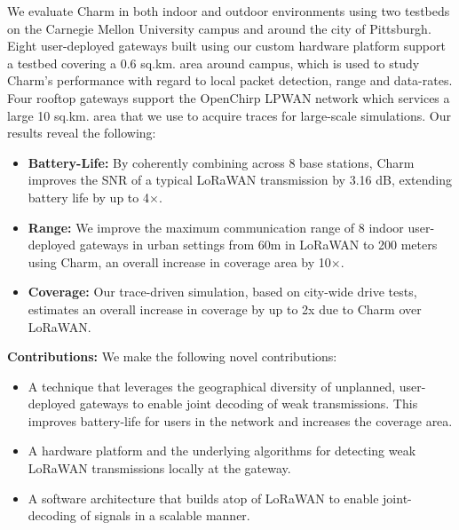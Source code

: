 We evaluate Charm in both indoor and outdoor environments using two testbeds
on the Carnegie Mellon University campus and around the city of Pittsburgh.
Eight user-deployed gateways built using our custom hardware platform support
a testbed covering a 0.6 sq.km. area around campus, which is used to study
Charm's performance with regard to local packet detection, range and
data-rates. Four rooftop gateways support the OpenChirp LPWAN network which
services a large 10 sq.km. area that we use to acquire traces for large-scale
simulations. Our results reveal the following:

\begin{itemize}
    \item {\bf Battery-Life: } By coherently combining across 8 base stations,
        Charm improves the SNR of a typical LoRaWAN transmission by 3.16 dB,
        extending battery life by up to 4$\times$.
    \item {\bf Range: } We improve the maximum communication range of 8 indoor
        user-deployed gateways in urban settings from 60m in LoRaWAN to 200
        meters using Charm, an overall increase in coverage area by
        10$\times$.
    \item {\bf Coverage: } Our trace-driven simulation, based on city-wide
        drive tests, estimates an overall increase in coverage by up to 2x due
        to Charm over LoRaWAN.
\end{itemize}

\noindent \textbf{Contributions:} We make the following novel contributions:
\begin{itemize}
    \item A technique that leverages the geographical diversity of unplanned,
        user-deployed gateways to enable joint decoding of weak transmissions.
        This improves battery-life for users in the network and increases the
        coverage area.
    \item A hardware platform and the underlying algorithms for detecting weak
        LoRaWAN transmissions locally at the gateway.
    \item A software architecture that builds atop of LoRaWAN to enable
        joint-decoding of signals in a scalable manner.
\end{itemize}